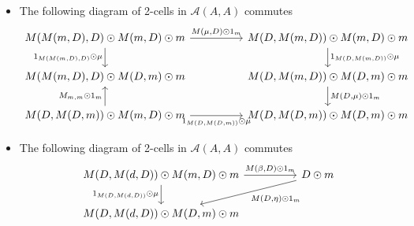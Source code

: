 \begin{itemize}
    \item The following diagram of 2-cells in $\mathcal{A}(A,A)$ commutes
    \[\begin{tikzcd}
    	{ M(M(m,D),D)\odot M(m,D)\odot m} && {M(D,M(m,D))\odot M(m,D)\odot m} \\
    	{M(M(m,D),D)\odot M(D,m)\odot m} && {M(D,M(m,D))\odot M(D,m)\odot m} \\
    	{M(D,M(D,m))\odot M(m,D)\odot m} && {M(D,M(D,m))\odot M(D,m)\odot m}
    	\arrow["{M(\mu,D)\odot 1_m}", from=1-1, to=1-3]
    	\arrow["{1_{M(D,M(m,D))}\odot \mu}", from=1-3, to=2-3]
    	\arrow["{M(D,\mu)\odot 1_m}", from=2-3, to=3-3]
    	\arrow["{1_{M(M(m,D),D)}\odot \mu}"', from=1-1, to=2-1]
    	\arrow["{M_{m,m}\odot 1_m}", from=3-1, to=2-1]
    	\arrow["{1_{M(D,M(D,m))}\odot \mu}"', from=3-1, to=3-3]
    \end{tikzcd}\]
    \item The following diagram of 2-cells in $\mathcal{A}(A,A)$ commutes
    \[\begin{tikzcd}
    	{M(D,M(d,D))\odot M(m,D)\odot m} && {D\odot m} \\
    	{M(D,M(d,D))\odot M(D,m)\odot m}
    	\arrow["{1_{M(D,M(d,D))}\odot \mu}"', from=1-1, to=2-1]
    	\arrow["{M(\beta,D)\odot 1_m}", from=1-1, to=1-3]
    	\arrow["{M(D,\eta)\odot 1_m}", from=1-3, to=2-1]
    \end{tikzcd}\]
\end{itemize}
